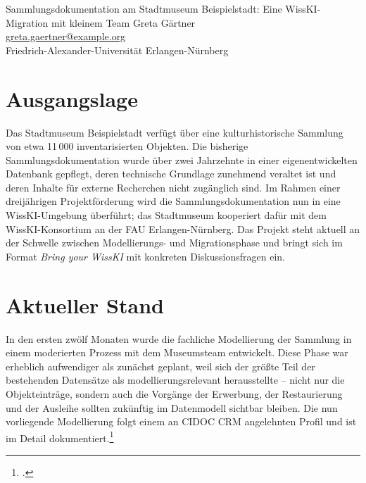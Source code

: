 \graphicspath{{abstracts/byw/02-stadtmuseum-beispielstadt/img/}{img/}}

\begin{beitrag}{Sammlungsdokumentation am Stadtmuseum Beispielstadt: Eine WissKI-Migration mit kleinem Team}{%
Greta Gärtner\, \\
\small \href{mailto:greta.gaertner@example.org}{greta.gaertner@example.org} \\
\small Friedrich-Alexander-Universität Erlangen-Nürnberg
}

\begin{abstract}
Das Projekt überführt die Sammlungsdokumentation des Stadtmuseums Beispielstadt (ca. 11.000 Objekte) aus einer veralteten Eigenentwicklung in eine WissKI-Umgebung mit einem kleinen Museumsteam; in den ersten zwölf Monaten wurde ein CIDOC-CRM-angelehntes Datenmodell entwickelt, das auch Ereignisse der Erwerbung, Restaurierung und Ausleihe abbildet, und die Pathbuilder-Konfiguration an einer 240-Objekte-Testinstanz finalisiert. Aktuell werden die ersten 1.500 Objekte des Hauptbestands migriert; zur Diskussion gestellt werden Organisationsmodelle für kleine Museumsteams, der produktive Umgang mit historisch gewachsenen Datenqualitätsproblemen sowie die Schnittstellenanbindung an einen regionalen Museumsverbund.
\end{abstract}

\section{Ausgangslage}
Das Stadtmuseum Beispielstadt verfügt über eine kulturhistorische Sammlung von etwa 11\,000 inventarisierten Objekten. Die bisherige Sammlungsdokumentation wurde über zwei Jahrzehnte in einer eigenentwickelten Datenbank gepflegt, deren technische Grundlage zunehmend veraltet ist und deren Inhalte für externe Recherchen nicht zugänglich sind. Im Rahmen einer dreijährigen Projektförderung wird die Sammlungsdokumentation nun in eine WissKI-Umgebung überführt; das Stadtmuseum kooperiert dafür mit dem WissKI-Konsortium an der FAU Erlangen-Nürnberg. Das Projekt steht aktuell an der Schwelle zwischen Modellierungs- und Migrationsphase und bringt sich im Format \emph{Bring your WissKI} mit konkreten Diskussionsfragen ein.

\section{Aktueller Stand}
In den ersten zwölf Monaten wurde die fachliche Modellierung der Sammlung in einem moderierten Prozess mit dem Museumsteam entwickelt. Diese Phase war erheblich aufwendiger als zunächst geplant, weil sich der größte Teil der bestehenden Datensätze als modellierungsrelevant herausstellte -- nicht nur die Objekteinträge, sondern auch die Vorgänge der Erwerbung, der Restaurierung und der Ausleihe sollten zukünftig im Datenmodell sichtbar bleiben. Die nun vorliegende Modellierung folgt einem an CIDOC CRM angelehnten Profil und ist im Detail dokumentiert.\footcite[52]{gaertner2025-museumsmodell}


\end{beitrag}
